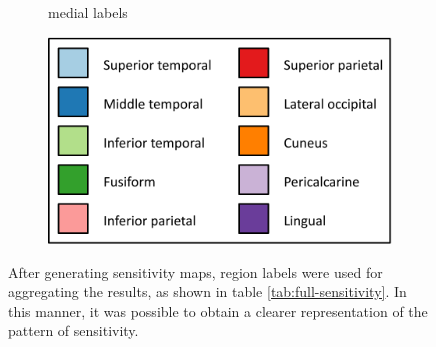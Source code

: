 \documentclass[5p,authoryear]{elsarticle}
\begin{document}
\begin{figure}
\begin{subfigure}{0.3\textwidth}
\caption{medial labels}
\label{fig:medial-labels}
\end{subfigure}
\begin{subfigure}{0.3\textwidth}
\centering
\includegraphics[width=\textwidth]{figures/sensitivity-legend-crop}
\end{subfigure}
\caption{After generating sensitivity maps, region labels were used for aggregating the results, as shown in table \ref{tab:full-sensitivity}. In this manner, it was possible to obtain a clearer representation of the pattern of sensitivity.}
\label{fig:labels}
\end{figure}
\end{document}
